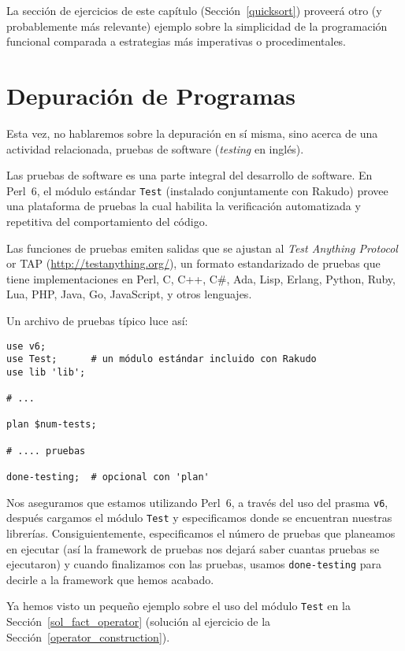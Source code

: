 La sección de ejercicios de este capítulo (Sección~\ref{quicksort}) 
proveerá otro (y probablemente más relevante) ejemplo sobre la simplicidad
de la programación funcional comparada a estrategias
más imperativas o procedimentales.

\section{Depuración de Programas}
\label{test_module}

Esta vez, no hablaremos sobre la depuración en sí misma,
sino acerca de una actividad relacionada, pruebas de software 
(\emph{testing} en inglés).

Las pruebas de software es una parte integral del desarrollo de software.
En Perl~6, el módulo estándar {\tt Test} (instalado conjuntamente con Rakudo)
provee una plataforma de pruebas la cual habilita la verificación automatizada
y repetitiva del comportamiento del código.


Las funciones de pruebas emiten salidas que se ajustan al \emph{Test 
Anything Protocol} or TAP (\url{http://testanything.org/}), un formato 
estandarizado de pruebas que tiene implementaciones en Perl, 
C, C++, C\#, Ada, Lisp, Erlang, Python, Ruby, Lua, PHP, Java, 
Go, JavaScript, y otros lenguajes.

Un archivo de pruebas típico luce así:

\begin{verbatim}
use v6;
use Test;      # un módulo estándar incluido con Rakudo
use lib 'lib';

# ...

plan $num-tests;

# .... pruebas

done-testing;  # opcional con 'plan'
\end{verbatim}

Nos aseguramos que estamos utilizando Perl~6, a través del uso
del prasma \verb|v6|, después cargamos el módulo \verb|Test|
y especificamos donde se encuentran nuestras librerías. Consiguientemente,
especificamos el número de pruebas que planeamos en ejecutar
(así la framework de pruebas nos dejará saber cuantas pruebas se
ejecutaron) y cuando finalizamos con las pruebas, usamos {\tt done-testing}
para decirle a la framework que hemos acabado.

Ya hemos visto un pequeño ejemplo sobre el uso del módulo \verb|Test| en
la Sección~\ref{sol_fact_operator} (solución al ejercicio 
de la Sección~\ref{operator_construction}).

